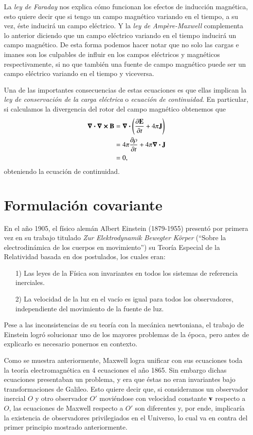 La \textit{ley de Faraday} nos explica cómo funcionan los efectos de inducción magnética, esto quiere decir que si tengo un campo magnético variando en el tiempo, a su vez, éste inducirá un campo eléctrico.  Y la \textit{ley de Ampère-Maxwell} complementa lo anterior diciendo que un campo eléctrico variando en el tiempo inducirá un campo magnético. De esta forma podemos hacer notar que no solo las cargas e imanes son los culpables de influir en los campos eléctricos y magnéticos respectivamente, si no que también una fuente de campo magnético puede ser un campo eléctrico variando en el tiempo y viceversa.

Una de las importantes consecuencias de estas ecuaciones es que ellas implican la \textit{ley de conservación de la carga eléctrica} o \textit{ecuación de continuidad}. En particular, si calculamos la divergencia del rotor del campo magnético obtenemos que
\begin{align}
\div{\curl{\vb{B}}} &= \div{ \left( \pdv{\vb{E}}{t} + 4\pi \vb{J} \right) }\\
&= 4\pi \pdv{\rho}{t} + 4\pi \div{\vb{J}}\\
&= 0,
\end{align}
obteniendo la ecuación de continuidad.

\section{Formulación covariante}

En el año 1905, el físico alemán Albert Einstein (1879-1955) presentó por primera vez en su trabajo titulado \textit{Zur Elektrodynamik Bewegter Körper} \cite{Einstein} (``Sobre la electrodinámica de los cuerpos en movimiento'') su Teoría Especial de la Relatividad basada en dos postulados, los cuales eran:
\begin{itemize}
\item[1)] Las leyes de la Física son invariantes en todos los sistemas de referencia inerciales.
\item[2)] La velocidad de la luz en el vacío es igual para todos los observadores, independiente del movimiento de la fuente de luz.
\end{itemize}

Pese a las inconsistencias de su teoría con la mecánica newtoniana, el trabajo de Einstein logró solucionar uno de los mayores problemas de la época, pero antes de explicarlo es necesario ponernos en contexto.

Como se muestra anteriormente, Maxwell logra unificar con sus ecuaciones toda la teoría electromagnética en 4 ecuaciones el año 1865. Sin embargo dichas ecuaciones presentaban un problema, y era que éstas no eran invariantes bajo transformaciones de Galileo. Esto quiere decir que, si consideramos un observador inercial $O$ y otro observador $O'$ moviéndose con velocidad constante $\vb{v}$ respecto a $O$, las ecuaciones de Maxwell respecto a $O'$ son diferentes y, por ende, implicaría la existencia de observadores privilegiados en el Universo, lo cual va en contra del primer principio mostrado anteriormente. 


